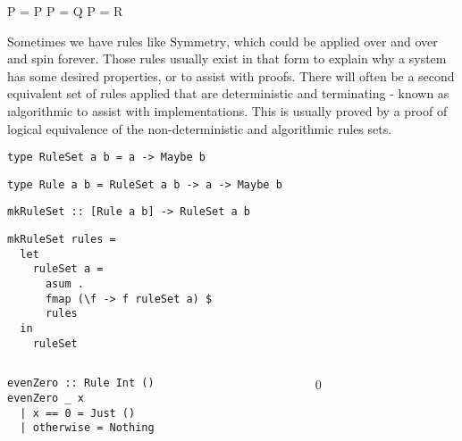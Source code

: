\begin{frame}[c]
  \begin{mdframed}[frametitle={Equivalence relations}]

  \infrule[Reflexivity]
          {}
          {P = P}
          {P = Q}
          {P = R}
  \end{mdframed}

  \medskip

  \begin{overprint}
  \onslide<+>
  Sometimes we have rules like $\text{Symmetry}$, which could be applied over and over and spin forever.
  \onslide<+>
  Those rules usually exist in that form to explain why a system has some desired properties, or to assist with proofs.
  \onslide<+>
  There will often be a second equivalent set of rules applied that are deterministic and terminating - known as {\i algorithmic} to assist with implementations.
  \onslide<+>
  This is usually proved by a proof of logical equivalence of the non-deterministic and algorithmic rules sets.
  \end{overprint}
\end{frame}

\begin{frame}[fragile]
  \onslide<+->
  \begin{verbatim}
type RuleSet a b = a -> Maybe b
  \end{verbatim}

  \onslide<+->
  \begin{verbatim}
type Rule a b = RuleSet a b -> a -> Maybe b
  \end{verbatim}

  \onslide<+->
  \begin{verbatim}
mkRuleSet :: [Rule a b] -> RuleSet a b
  \end{verbatim}

  \onslide<+->
  \begin{verbatim}
mkRuleSet rules =
  let
    ruleSet a =
      asum .
      fmap (\f -> f ruleSet a) $
      rules
  in
    ruleSet
  \end{verbatim}
\end{frame}

\begin{frame}[fragile]
  \begin{columns}
    \begin{column}{0.5\textwidth}
      \begin{verbatim}
evenZero :: Rule Int ()
evenZero _ x
  | x == 0 = Just ()
  | otherwise = Nothing
      \end{verbatim}
    \end{column}
    \begin{column}{0.5\textwidth}
          {~0}
    \end{column}
  \end{columns}
\end{frame}

